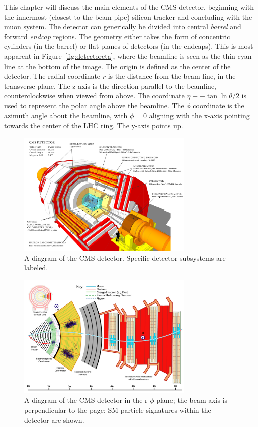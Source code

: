 This chapter will discuss the main elements of the CMS detector, beginning with the innermost (closest to the beam pipe) silicon tracker and concluding with the muon system. The detector can generically be divided into central \textit{barrel} and forward \textit{endcap} regions. The geometry either takes the form of concentric cylinders (in the barrel) or flat planes of detectors (in the endcaps). This is most apparent in Figure~\ref{fig:detectoreta}, where the beamline is seen as the thin cyan line at the bottom of the image. The origin is defined as the center of the detector. The radial coordinate $r$ is the distance from the beam line, in the transverse plane. The z axis is the direction parallel to the beamline, counterclockwise when viewed from above. The coordinate $\eta\equiv-\tan{\ln{\theta/2}}$ is used to represent the polar angle above the beamline. The $\phi$ coordinate is the azimuth angle about the beamline, with $\phi=0$ aligning with the x-axis pointing towards the center of the LHC ring. The y-axis points up.

\begin{figure}[hbp!]
\centering
\includegraphics[width=0.75\textwidth]{figs/howcmsworks.png}
\caption[A diagram of the CMS detector.]{A diagram of the CMS detector. Specific detector subsystems are labeled.}
\label{fig:howcmsworks}
\end{figure}

\begin{figure}[hbp!]
\centering
\includegraphics[width=0.75\textwidth]{figs/CMS-PRF-14-001_Figure_001.pdf}
\caption[A diagram of the CMS detector in the r-$\phi$ plane; particle signatures are shown.]{A diagram of the CMS detector in the r-$\phi$ plane; the beam axis is perpendicular to the page; SM particle signatures within the detector are shown.}
\label{fig:schematicview}
\end{figure}

